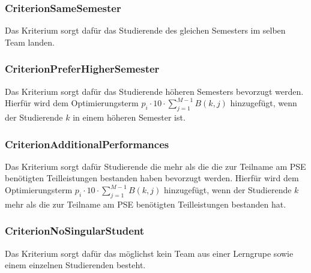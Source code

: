 \documentclass[parskip=full]{scrartcl}
\begin{document}
\subsubsection{CriterionSameSemester}
Das Kriterium sorgt dafür das Studierende des gleichen Semesters im selben Team
landen.
\subsubsection{CriterionPreferHigherSemester}
Das Kriterium sorgt dafür das Studierende höheren Semesters bevorzugt werden. Hierfür wird dem Optimierungsterm
$p_i \cdot 10 \cdot \sum_{j = 1}^{M-1} B(k,j)$ hinzugefügt, wenn der
Studierende $k$ in einem höheren Semester ist.
\subsubsection{CriterionAdditionalPerformances}
Das Kriterium sorgt dafür Studierende die mehr als die die zur Teilname am PSE
benötigten Teilleistungen bestanden haben bevorzugt werden. Hierfür wird dem Optimierungsterm
$p_i \cdot 10 \cdot \sum_{j = 1}^{M-1} B(k,j)$ hinzugefügt, wenn der Studierende
$k$ mehr als die zur Teilname am PSE benötigten Teilleistungen bestanden hat.
\subsubsection{CriterionNoSingularStudent}
Das Kriterium sorgt dafür das möglichst kein Team aus einer Lerngrupe sowie
einem einzelnen Studierenden besteht.
\end{document}

